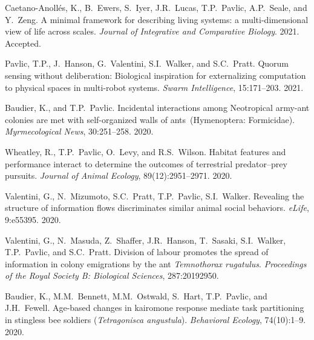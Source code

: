 \documentclass[10pt]{article}
\begin{document}
\begin{bibenum}
    \item Caetano-Anoll{\'{e}}s, K., B.~Ewers, S.~Iyer, J.R.~Lucas,
        T.P.~Pavlic, A.P.~Seale, and Y.~Zeng.
        A minimal framework for describing living systems: a
        multi-dimensional view of life across scales.
        \emph{Journal of Integrative and Comparative Biology}. 2021.
        Accepted.

    \item Pavlic, T.P., J.~Hanson, G.~Valentini, S.I.~Walker, and
        S.C.~Pratt.
        Quorum sensing without deliberation: Biological inspiration for externalizing computation to physical spaces in
        multi-robot systems.
        \emph{Swarm Intelligence}, 15:171--203. 2021.

    \item Baudier, K., and T.P.~Pavlic.
        Incidental interactions among Neotropical army-ant colonies are
        met with self-organized walls of ants~(Hymenoptera: Formicidae).
        \emph{Myrmecological News}, 30:251--258. 2020.

    \item Wheatley, R., T.P.~Pavlic, O.~Levy, and R.S.~Wilson.
        Habitat features and performance interact to determine the
        outcomes of terrestrial predator--prey pursuits.
        \emph{Journal of Animal Ecology}, 89(12):2951--2971. 2020.

    \item Valentini, G., N.~Mizumoto, S.C.~Pratt, T.P.~Pavlic, S.I.~Walker.
        Revealing the structure of information flows discriminates
        similar animal social behaviors.
        \emph{eLife}, 9:e55395. 2020.

    \item Valentini, G., N.~Masuda, Z.~Shaffer, J.R.~Hanson, T.~Sasaki,
        S.I.~Walker, T.P.~Pavlic, and S.C.~Pratt.
        Division of labour promotes the spread of information in colony
        emigrations by the ant \emph{Temnothorax rugatulus}.
        \emph{Proceedings of the Royal Society B: Biological Sciences},
        287:20192950.

    \item Baudier, K., M.M.~Bennett, M.M.~Ostwald, S.~Hart, T.P.~Pavlic,
        and J.H.~Fewell. Age-based changes in kairomone response mediate
        task partitioning in stingless bee soldiers (\emph{Tetragonisca
        angustula}). \emph{Behavioral Ecology}, 74(10):1--9. 2020.


\end{bibenum}
\end{document}
